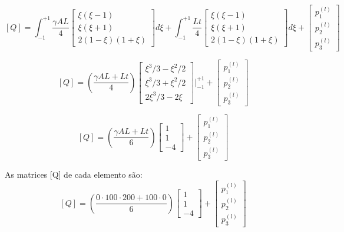\documentclass{article} %
\begin{document}
\begin{equation*}\label{}
[Q]=\int_{-1}^{+1}\frac{\gamma AL}{4}\begin{bmatrix}
\xi(\xi-1)\\\xi(\xi+1)\\2(1-\xi)(1+\xi)
\end{bmatrix}d\xi+\int_{-1}^{+1}\frac{Lt}{4}\begin{bmatrix}
\xi(\xi-1)\\\xi(\xi+1)\\2(1-\xi)(1+\xi)
\end{bmatrix}d\xi+\begin{bmatrix}
p_1^{(l)}\\
p_2^{(l)}\\
p_3^{(l)}
\end{bmatrix}
\end{equation*}

\begin{equation*}\label{}
[Q]=\left(  \frac{\gamma AL+Lt}{4}  \right)
\begin{bmatrix}
\xi^3/3-\xi^2/2\\\xi^3/3+\xi^2/2\\2\xi^3/3-2\xi
\end{bmatrix}\biggr|_{-1}^{+1}+\begin{bmatrix}
p_1^{(l)}\\
p_2^{(l)}\\
p_3^{(l)}
\end{bmatrix}
\end{equation*}

\begin{equation}\label{}
[Q]=\left(  \frac{\gamma AL+Lt}{6}  \right)
\begin{bmatrix}
1\\
1\\
-4
\end{bmatrix}+\begin{bmatrix}
p_1^{(l)}\\
p_2^{(l)}\\
p_3^{(l)}
\end{bmatrix}
\end{equation}

\indent As matrices [Q] de cada elemento são:
\begin{equation*}\label{}
[Q]=\left(  \frac{0\cdot 100\cdot 200 +100\cdot 0}{6}  \right)
\begin{bmatrix}
1\\
1\\
-4
\end{bmatrix}+\begin{bmatrix}
p_1^{(l)}\\
p_2^{(l)}\\
p_3^{(l)}
\end{bmatrix}
\end{equation*}
\end{document}
